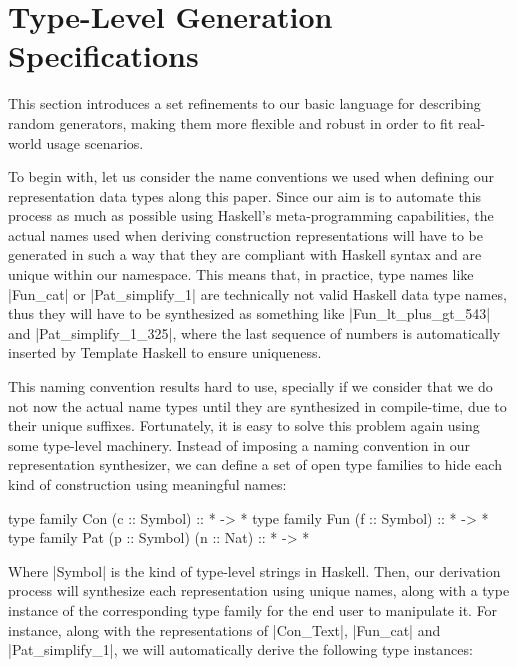 \section{Type-Level Generation Specifications}
\label{sec:typelevel}

%
This section introduces a set refinements to our basic language for describing
random generators, making them more flexible and robust in order to fit
real-world usage scenarios.


%
To begin with, let us consider the name conventions we used when defining our
representation data types along this paper.
%
Since our aim is to automate this process as much as possible using Haskell's
meta-programming capabilities, the actual names used when deriving construction
representations will have to be generated in such a way that they are compliant
with Haskell syntax and are unique within our namespace.
%
This means that, in practice, type names like |Fun_cat| or |Pat_simplify_1| are
technically not valid Haskell data type names, thus they will have to be
synthesized as something like |Fun_lt_plus_gt_543| and |Pat_simplify_1_325|,
where the last sequence of numbers is automatically inserted by Template Haskell
to ensure uniqueness.


This naming convention results hard to use, specially if we consider that we do
not now the actual name types until they are synthesized in compile-time, due to
their unique suffixes.
%
Fortunately, it is easy to solve this problem again using some type-level
machinery.
%
Instead of imposing a naming convention in our representation synthesizer, we
can define a set of open type families to hide each kind of construction using
meaningful names:

\begin{code}
type family Con (c :: Symbol)             :: * -> *
type family Fun (f :: Symbol)             :: * -> *
type family Pat (p :: Symbol) (n :: Nat)  :: * -> *
\end{code}

Where |Symbol| is the kind of type-level strings in Haskell.
%
Then, our derivation process will synthesize each representation using unique
names, along with a type instance of the corresponding type family for the end
user to manipulate it.
%
For instance, along with the representations of |Con_Text|, |Fun_cat| and
|Pat_simplify_1|, we will automatically derive the following type instances:

